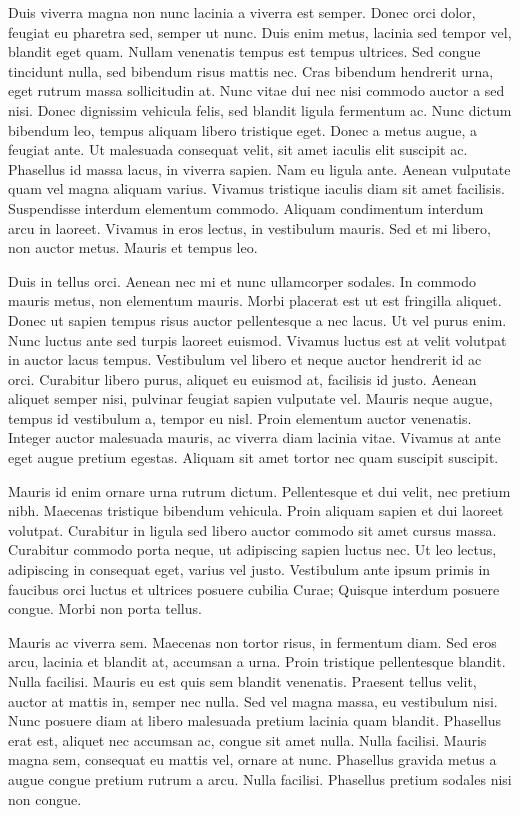 Duis viverra magna non nunc lacinia a viverra est semper.
Donec orci dolor, feugiat eu pharetra sed, semper ut nunc.
Duis enim metus, lacinia sed tempor vel, blandit eget quam.
Nullam venenatis tempus est tempus ultrices.
Sed congue tincidunt nulla, sed bibendum risus mattis nec.
Cras bibendum hendrerit urna, eget rutrum massa sollicitudin at.
Nunc vitae dui nec nisi commodo auctor a sed nisi.
Donec dignissim vehicula felis, sed blandit ligula fermentum ac.
Nunc dictum bibendum leo, tempus aliquam libero tristique eget.
Donec a metus augue, a feugiat ante.
Ut malesuada consequat velit, sit amet iaculis elit suscipit ac.
Phasellus id massa lacus, in viverra sapien.
Nam eu ligula ante.
Aenean vulputate quam vel magna aliquam varius.
Vivamus tristique iaculis diam sit amet facilisis.
Suspendisse interdum elementum commodo.
Aliquam condimentum interdum arcu in laoreet.
Vivamus in eros lectus, in vestibulum mauris.
Sed et mi libero, non auctor metus.
Mauris et tempus leo.

Duis in tellus orci.
Aenean nec mi et nunc ullamcorper sodales.
In commodo mauris metus, non elementum mauris.
Morbi placerat est ut est fringilla aliquet.
Donec ut sapien tempus risus auctor pellentesque a nec lacus.
Ut vel purus enim.
Nunc luctus ante sed turpis laoreet euismod.
Vivamus luctus est at velit volutpat in auctor lacus tempus.
Vestibulum vel libero et neque auctor hendrerit id ac orci.
Curabitur libero purus, aliquet eu euismod at, facilisis id justo.
Aenean aliquet semper nisi, pulvinar feugiat sapien vulputate vel.
Mauris neque augue, tempus id vestibulum a, tempor eu nisl.
Proin elementum auctor venenatis.
Integer auctor malesuada mauris, ac viverra diam lacinia vitae.
Vivamus at ante eget augue pretium egestas.
Aliquam sit amet tortor nec quam suscipit suscipit.

Mauris id enim ornare urna rutrum dictum.
Pellentesque et dui velit, nec pretium nibh.
Maecenas tristique bibendum vehicula.
Proin aliquam sapien et dui laoreet volutpat.
Curabitur in ligula sed libero auctor commodo sit amet cursus massa.
Curabitur commodo porta neque, ut adipiscing sapien luctus nec.
Ut leo lectus, adipiscing in consequat eget, varius vel justo.
Vestibulum ante ipsum primis in faucibus orci luctus et ultrices posuere cubilia Curae; Quisque interdum posuere congue.
Morbi non porta tellus.

Mauris ac viverra sem.
Maecenas non tortor risus, in fermentum diam.
Sed eros arcu, lacinia et blandit at, accumsan a urna.
Proin tristique pellentesque blandit.
Nulla facilisi.
Mauris eu est quis sem blandit venenatis.
Praesent tellus velit, auctor at mattis in, semper nec nulla.
Sed vel magna massa, eu vestibulum nisi.
Nunc posuere diam at libero malesuada pretium lacinia quam blandit.
Phasellus erat est, aliquet nec accumsan ac, congue sit amet nulla.
Nulla facilisi.
Mauris magna sem, consequat eu mattis vel, ornare at nunc.
Phasellus gravida metus a augue congue pretium rutrum a arcu.
Nulla facilisi.
Phasellus pretium sodales nisi non congue.

